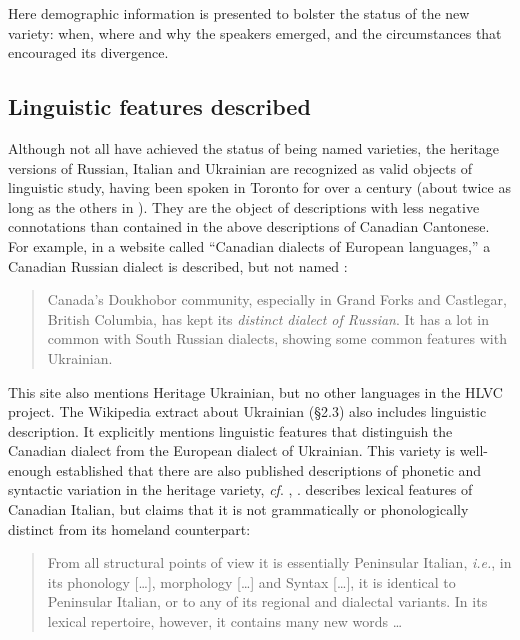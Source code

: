 \documentclass[output=paper]{LSP/langsci}
\begin{document}
Here demographic information is presented to bolster the status of the new variety: when, where and why the speakers emerged, and the circumstances that encouraged its divergence. 

\subsection{Linguistic features described}

Although not all have achieved the status of being named varieties, the heritage versions of Russian, Italian and Ukrainian are recognized as valid objects of linguistic study, having been spoken in Toronto for over a century (about twice as long as the others in ). They are the object of descriptions with less negative connotations than contained in the above descriptions of Canadian Cantonese. For example, in a website called “Canadian dialects of European languages,” a Canadian Russian dialect is described, but not named \citep{language_factory_canadian_2013}:

\begin{quote}
Canada’s Doukhobor community, especially in Grand Forks and Castlegar, British Columbia, has kept its \textit{distinct dialect of Russian}. It has a lot in common with South Russian dialects, showing some common features with Ukrainian. 
\end{quote}

This site also mentions Heritage Ukrainian, but no other languages in the HLVC project. The Wikipedia extract about Ukrainian (§2.3) also includes linguistic description. It explicitly mentions linguistic features that distinguish the Canadian dialect from the European dialect of Ukrainian. This variety is well-enough established that there are also published descriptions of phonetic and syntactic variation in the heritage variety, \textit{cf}. \citet{hudyma_ukrainian_2011}, \citet{struk_between_2000}. \citet{danesi_canadian_1983,danesi_canadian_1984} describes lexical features of Canadian Italian, but claims that it is not grammatically or phonologically distinct from its homeland counterpart: 

\begin{quote}
From all structural points of view it is essentially Peninsular Italian, \textit{i.e.}, in its phonology […], morphology […] and Syntax […], it is identical to Peninsular Italian, or to any of its regional and dialectal variants. In its lexical repertoire, however, it contains many new words … 
\end{quote}
\end{document}
